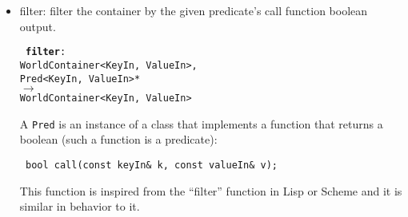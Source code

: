 \documentclass{article}
\begin{document}
\begin{itemize}
   {\em Example:}\\

  Starting with a {\tt WorldContainer<int,int> dfc1} that contains 
  {\tt (0,0), (1,1), (2,2), (3,3), (4,4), (5,5), (6,6), (7,7)},
  a {\tt WorldContainer<int,char> dfc2} that contains
  {\tt (0,'A'), (1,'B'), (4,'C'), (9,'D') }
  and with a {\tt JoinOp} defined like this: 

  {\tt
  class IdJoin : public JoinOp<int,int,int>\{\\
  public:

  virtual int join (const int\& k, const int\& vIn)\{
      return k;\\
  \}\\
  \};\\
  }

  one could write this piece of code:

  {\tt
  IdJoin * id = new IdJoin;\\
  WorldContainer<int,std::pair<std::pair<int,int>,std::pair<char,bool>>> dfc3 = dfc1.join2(dfc2, id);\\
  dfc3.fence();\\
  }

  and the result would be: {\tt (0,pair< pair<0,0>, true >), 
    (1,pair< pair<1,1>, true >), (2,pair< pair<2,2>, false >),
     (3,pair< pair<3,3>, false >), (4,pair< pair<4,4>, true >),
     (5,pair< pair<5,5>, false >),
     (6,pair< pair<6,6>, false >),
     (7,pair< pair<7,7>, false >) }

  \item filter: filter the container by the given predicate's call function boolean output.

    {\tt
    {\bf filter}:\\
    WorldContainer<KeyIn, ValueIn>,\\
    Pred<KeyIn, ValueIn>*\\
    $\rightarrow$\\
    WorldContainer<KeyIn, ValueIn>\\
    }

    A {\tt Pred} is an instance of a class that implements a function
    that returns a boolean (such a function is a predicate):

    {\tt
    bool call(const keyIn\& k, const valueIn\& v);\\
    }

    This function is inspired from the ``filter'' function in Lisp or Scheme
    and it is similar in behavior to it. 


\end{itemize}
\end{document}
